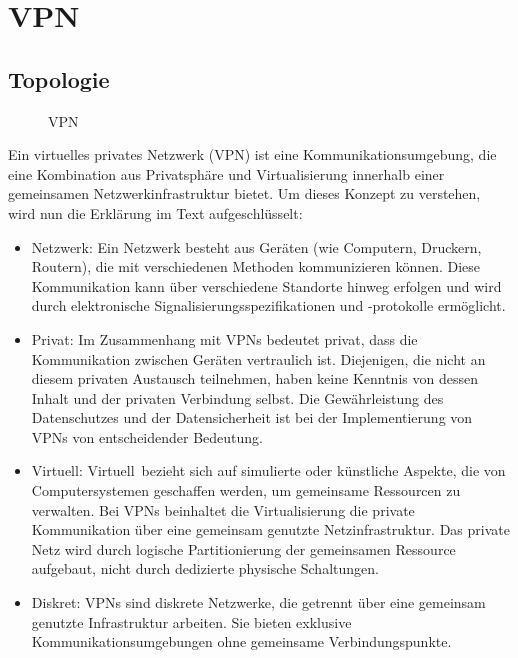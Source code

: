 \section{VPN}

\subsection{Topologie}

\begin{figure}[h!]
    \centering
    
    \caption{VPN}
    \label{imgs:vpn}
\end{figure}

Ein virtuelles privates Netzwerk (VPN) ist eine Kommunikationsumgebung, die eine Kombination aus Privatsphäre und Virtualisierung innerhalb einer gemeinsamen Netzwerkinfrastruktur bietet. Um dieses Konzept zu verstehen, wird nun die Erklärung im Text aufgeschlüsselt:

\begin{itemize}

\item Netzwerk: Ein Netzwerk besteht aus Geräten (wie Computern, Druckern, Routern), die mit verschiedenen Methoden kommunizieren können. Diese Kommunikation kann über verschiedene Standorte hinweg erfolgen und wird durch elektronische Signalisierungsspezifikationen und -protokolle ermöglicht.

\item Privat: Im Zusammenhang mit VPNs bedeutet \glqq privat\grqq, dass die Kommunikation zwischen Geräten vertraulich ist. Diejenigen, die nicht an diesem privaten Austausch teilnehmen, haben keine Kenntnis von dessen Inhalt und der privaten Verbindung selbst. Die Gewährleistung des Datenschutzes und der Datensicherheit ist bei der Implementierung von VPNs von entscheidender Bedeutung.

\item Virtuell: \glqq Virtuell\grqq\ bezieht sich auf simulierte oder künstliche Aspekte, die von Computersystemen geschaffen werden, um gemeinsame Ressourcen zu verwalten. Bei VPNs beinhaltet die Virtualisierung die private Kommunikation über eine gemeinsam genutzte Netzinfrastruktur. Das private Netz wird durch logische Partitionierung der gemeinsamen Ressource aufgebaut, nicht durch dedizierte physische Schaltungen.

\item Diskret: VPNs sind diskrete Netzwerke, die getrennt über eine gemeinsam genutzte Infrastruktur arbeiten. Sie bieten exklusive Kommunikationsumgebungen ohne gemeinsame Verbindungspunkte.

\end{itemize}

